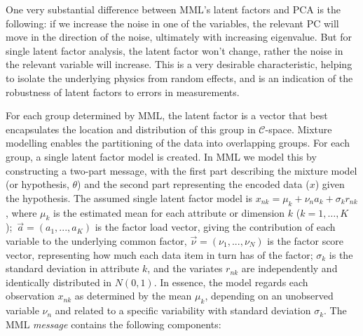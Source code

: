 \documentclass{elsarticle}
\newcommand{\Cspaceno}{$\mathcal{C}$-space}
\begin{document}
One very substantial difference between MML's latent factors and PCA is the following: if we increase the noise in 
one of the variables, the relevant PC will move in the direction of the noise, ultimately with increasing eigenvalue. 
But for single latent factor analysis, the latent factor 
won't change, rather the noise %
in the relevant variable will increase. This is a very desirable characteristic, helping to isolate
the underlying physics from random effects, and is an indication of the robustness of latent factors
to errors in measurements. 

For each group determined by MML, the latent factor is a vector that best encapsulates the location 
and distribution of this group in \Cspaceno.
Mixture modelling enables the partitioning of the data into overlapping groups. 
For each group, a single latent factor model is created. 
In MML we  model this by constructing a two-part message, with the first part describing the mixture 
model (or hypothesis, $\theta$) and the second part representing the encoded data ($x$) given the hypothesis. 
The assumed single latent factor model is $x_{n k} = \mu_k + \nu_n a_k + \sigma_k r_{n k}$, where $\mu_k$ is the 
estimated mean for each attribute or dimension $k$ ($k=1, \ldots, K$);~$\vec{a} = (a_1,  ...,  a_K)$ is the factor load vector, giving the 
contribution of each variable to the underlying common factor, $\vec{\nu} = (\nu_1, ..., \nu_N)$ is the 
factor score vector, representing how much each data item in turn has of the factor;
$\sigma_k$ is the standard deviation in 
attribute $k$, and the variates $r_{n k}$ are independently and identically distributed  
in $N(0, 1)$. In essence, the model regards each observation $x_{n k}$ as determined by the 
mean $\mu_k$, depending on an unobserved variable $\nu_n$ and related to a specific 
variability with standard deviation $\sigma_k$. The MML \textit{message} contains the following components: 

\end{document}
